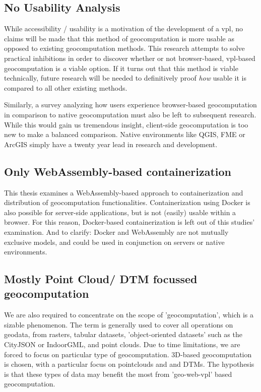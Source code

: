 \subsection*{No Usability Analysis} %
While accessibility / usability is a motivation of the development of a \ac{vpl}, no claims will be made that this method of geocomputation is more usable as opposed to existing geocomputation methods. This research attempts to solve practical inhibitions in order to discover whether or not browser-based, vpl-based geocomputation is \emph{a} viable option. If it turns out that this method is viable technically, future research will be needed to definitively proof \emph{how} usable it is compared to all other existing methods.  


Similarly, a survey analyzing how users experience browser-based geocomputation in comparison to native geocomputation must also be left to subsequent research. While this would gain us tremendous insight, client-side geocomputation is too new to make a balanced comparison. Native environments like QGIS, FME or ArcGIS simply have a twenty year lead in research and development. 


\subsection*{Only WebAssembly-based containerization}
This thesis examines a WebAssembly-based approach to containerization and distribution of geocomputation functionalities. 
Containerization using Docker is also possible for server-side applications, but is not (easily) usable within a browser. 
For this reason, Docker-based containerization is left out of this studies' examination. 
And to clarify: Docker and WebAssembly are not mutually exclusive models, and could be used in conjunction on servers or native environments. 

\subsection*{Mostly Point Cloud/ DTM focussed geocomputation}
We are also required to concentrate on the scope of 'geocomputation', which is a sizable phenomenon.
The term is generally used to cover all operations on geodata, from rasters, tabular datasets, 'object-oriented datasets' such as the CityJSON or IndoorGML, and point clouds. 
Due to time limitations, we are forced to focus on particular type of geocomputation.
3D-based geocomputation is chosen, with a particular focus on pointclouds and and DTMs. 
The hypothesis is that these types of data may benefit the most from 'geo-web-vpl' based geocomputation.

